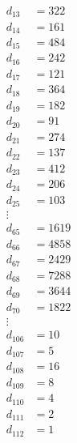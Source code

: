 \documentclass[10pt,letterpaper]{article}
\begin{document}
\begin{multicols}{4}
\begin{align*}
d_{13} &= 322 \\
d_{14} &= 161 \\
d_{15} &= 484 \\
d_{16} &= 242 \\
d_{17} &= 121 \\
d_{18} &= 364 \\
d_{19} &= 182 \\
d_{20} &= 91 \\
d_{21} &= 274 \\
d_{22} &= 137 \\
d_{23} &= 412 \\
d_{24} &= 206 \\
d_{25} &= 103 \\
\vdots \\
d_{65} &= 1619 \\
d_{66} &= 4858 \\
d_{67} &= 2429 \\
d_{68} &= 7288 \\
d_{69} &= 3644 \\
d_{70} &= 1822 \\
\vdots \\
d_{106} &= 10 \\
d_{107} &= 5 \\
d_{108} &= 16 \\
d_{109} &= 8 \\
d_{110} &= 4 \\
d_{111} &= 2 \\
d_{112} &= 1 \\
\end{align*}
\vfill
\end{multicols}
\end{document}
